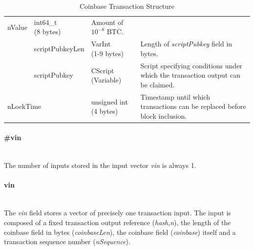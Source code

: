 \begin{table}[ht!]
\begin{tabular}{ | m{25pt} | m{70pt} | >{\centering} m{60pt} | m{200pt} | }
		nValue &
		\bigcell{c}{int64\_t \\ (8 bytes)} &
		Amount of $10^{-8}$ BTC. \\ \cline{2-4}
		
		& scriptPubkeyLen &
		\bigcell{c}{VarInt \\ (1-9 bytes)} &
		Length of \textit{scriptPubkey} field in bytes. \\ \cline{2-4}

		& scriptPubkey &
		\bigcell{c}{CScript \\ (Variable)} &
		Script specifying conditions under which the transaction output can be claimed. \\ \hline
    	
    	\multicolumn{2}{|l|}{nLockTime} &
    	\bigcell{c}{unsigned int \\ (4 bytes)} &
    	Timestamp until which transactions can be replaced before block inclusion.\\ \hline
	\end{tabular}
	
	\vspace{5pt}
	\caption{Coinbase Transaction Structure}
	\label{tab:TransactionCoinbase}
\end{table}
\vspace{-20pt}

\paragraph{\#vin}~\\
The number of inputs stored in the input vector \textit{vin} is always 1.

\paragraph{vin}~\\
The \textit{vin} field stores a vector of precisely one transaction input. The input is composed of a fixed transaction output reference (\textit{hash},\textit{n}), the length of the coinbase field in bytes (\textit{coinbaseLen}), the coinbase field (\textit{coinbase}) itself and a transaction sequence number (\textit{nSequence}).

